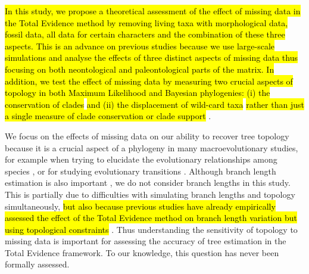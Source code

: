 \documentclass[12pt,letterpaper]{article}
\begin{document}
\hl{In this study, we propose a theoretical assessment of the effect of missing data in the Total Evidence method by removing living taxa with morphological data, fossil data, all data for certain characters and the combination of these three aspects.
This is an advance on previous studies because we use large-scale simulations and analyse the effects of three distinct aspects of missing data thus focusing on both neontological and paleontological parts of the matrix.
In addition, we test the effect of missing data by measuring two crucial aspects of topology in both Maximum Likelihood and Bayesian phylogenies: (i) the conservation of clades }\citep[\hl{based on the Robinson-Foulds distance;}][]{RF1981}\hl{ and (ii) the displacement of wild-card taxa }\citep[\hl{based on the Triplets distance;}][]{critchlowthe1996}\hl{ rather than just a single measure of clade conservation or clade support }\citep[\hl{cf.}][]{Wiens01102005,pattinsonphylogeny2014}.

We focus on the effects of missing data on our ability to recover tree topology because it is a crucial aspect of a phylogeny in many macroevolutionary studies, for example when trying to elucidate the evolutionary relationships among species \citep[e.g.][]{meredithimpacts2011,jetzthe2012}, or for studying evolutionary transitions \citep[e.g.][]{friedmanexplosive2010}.
Although branch length estimation is also important \citep[namely for timing extinction and/or speciation events; e.g.][]{ronquista2012}, we do not consider branch lengths in this study.
This is partially due to difficulties with simulating branch lengths and topology simultaneously, \hl{but also because previous studies have already empirically assessed the effect of the Total Evidence method on branch length variation but using topological constraints }\citep{ronquista2012,schragocombining2013,slaterphylogenetic2013,beckancient2014}.
Thus understanding the sensitivity of topology to missing data is important for assessing the accuracy of tree estimation in the Total Evidence framework. To our knowledge, this question has never been formally assessed.
\end{document}
